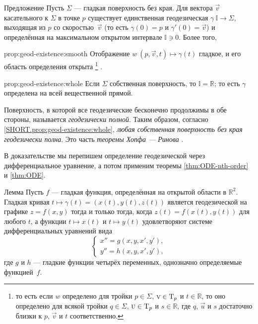 \begin{thm}{Предложение}\label{prop:geod-existence} 
Пусть $\Sigma$ --- гладкая поверхность без края.
Для вектора ${\vec v}$ касательного к $\Sigma$ в точке $p$ существует единственная геодезическая $\gamma\:\mathbb{I}\to \Sigma$, выходящая из $p$ со скоростью~${\vec v}$ (то есть $\gamma(0)=p$ и $\gamma'(0)={\vec v}$) и определённая на максимальном открытом интервале $\mathbb{I}\ni 0$.
Более того,
\begin{subthm}{prop:geod-existence:smooth}
Отображение $w\:(p,{\vec v},t)\mapsto \gamma(t)$ гладкое, и его область определения открыта%
\footnote{то есть если $w$ определено для тройки $p\in \Sigma$, ${\text{\sc{v}}}\in \mathrm{T}_p$ и $t\in \mathbb{R}$,
то оно определено для всякой тройки  $q\in \Sigma$, $\text{\sc{u}}\in \mathrm{T}_p$ и $s\in \mathbb{R}$, где $q$, $\vec u$ и $s$ достаточно близки к $p$, ${\vec v}$ и $t$ соответственно.}%
.
\end{subthm}

\begin{subthm}{prop:geod-existence:whole}
Если $\Sigma$ собственная поверхность, то $\mathbb{I}=\mathbb{R}$; то есть $\gamma$ определена на всей вещественной прямой.
\end{subthm}

\end{thm}

Поверхность, в которой все геодезические бесконечно продолжимы в обе стороны, называется \emph{геодезически полной}.
Таким образом, согласно \ref{SHORT.prop:geod-existence:whole}, \textit{любая собственная поверхность без края геодезически полна}.
Это часть \emph{теоремы Хопфа --- Ринова} \cite{hopf-rinow}.

В доказательстве мы перепишем определение геодезической через дифференциальное уравнение, а потом применим теоремы \ref{thm:ODE-nth-order} и \ref{thm:ODE}.



\begin{thm}{Лемма}\label{lem:geodesic=2nd-order}
Пусть $f$ --- гладкая функция, определённая на открытой области в $\mathbb{R}^2$.
Гладкая кривая $t\mapsto \gamma(t)=(x(t),y(t),z(t))$ является геодезической на графике $z=f(x,y)$ тогда и только тогда, когда $z(t)=f(x(t),y(t))$ для любого $t$, а функции $t\mapsto x(t)$ и $t\mapsto y(t)$ удовлетворяют системе дифференциальных уравнений вида
\[
\begin{cases}
x''=g(x,y,x',y'),
\\
y''=h(x,y,x',y'),
\end{cases}
\]
где $g$ и $h$ --- гладкие функции четырёх переменных, однозначно определяемые функцией~$f$.
\end{thm}

